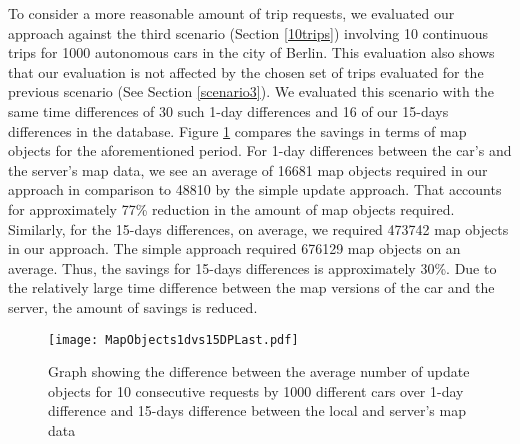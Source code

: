 To consider a more reasonable amount of trip requests, we evaluated our approach against the third scenario (Section \ref{10trips}) involving 10 continuous trips for 1000 autonomous cars in the city of Berlin. This evaluation also shows that our evaluation is not affected by the chosen set of trips evaluated for the previous scenario (See Section \ref{scenario3}). We evaluated this scenario with the same time differences of 30 such 1-day differences and 16 of our 15-days differences in the database. Figure \ref{fg:ber10x1000mo} compares the savings in terms of map objects for the aforementioned period. For 1-day differences between the car's and the server's map data, we see an average of 16681 map objects required in our approach in comparison to 48810 by the simple update approach. That accounts for approximately 77\% reduction in the amount of map objects required. Similarly, for the 15-days differences, on average, we required 473742 map objects in our approach. The simple approach required 676129 map objects on an average. Thus, the savings for 15-days differences is approximately 30\%. Due to the relatively large time difference between the map versions of the car and the server, the amount of savings is reduced. 

\begin{figure}
\centering
\texttt{[image: MapObjects1dvs15DPLast.pdf]}
\caption{Graph showing the difference between the average number of update objects for 10 consecutive requests by 1000 different cars over 1-day difference and 15-days difference between the local and server's map data }
\label{fg:ber10x1000mo}
\end{figure}

  





